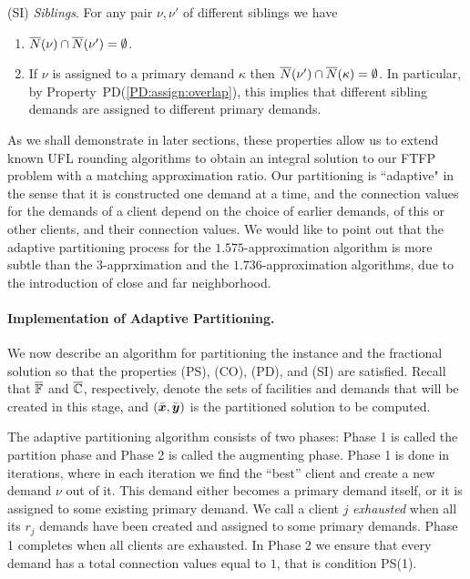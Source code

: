 \documentclass[11pt]{article}
\begin{document}
\begin{description}
\begin{enumerate}
\begin{enumerate}
			\end{enumerate}

	\end{enumerate}
	
\item{(SI)} \emph{Siblings}. For any pair $\nu,\nu'$ of different siblings we have
  \begin{enumerate}

	\item \label{SI:siblings disjoint}
		  ${\overline{N}}(\nu)\cap {\overline{N}}(\nu') = \emptyset$.
		
	\item \label{SI:primary disjoint} If $\nu$ is assigned to a primary demand $\kappa$ then
 		${\overline{N}}(\nu')\cap {\overline{N}}(\kappa) = \emptyset$. In particular, by Property~PD(\ref{PD:assign:overlap}),
		this implies that different sibling demands are assigned to different primary demands.

	\end{enumerate}
	
\end{description}

As we shall demonstrate in later sections, these properties allow us
to extend known UFL rounding algorithms to obtain an integral solution
to our FTFP problem with a matching approximation ratio. Our
partitioning is ``adaptive" in the sense that it is constructed one
demand at a time, and the connection values for the demands of a
client depend on the choice of earlier demands, of this or other
clients, and their connection values. We would like to point out that
the adaptive partitioning process for the $1.575$-approximation
algorithm is more subtle than the $3$-apprximation and the
$1.736$-approximation algorithms, due to the introduction of close and
far neighborhood.


\paragraph{Implementation of Adaptive Partitioning.}
We now describe an algorithm for partitioning the instance
and the fractional solution so that the properties (PS),
(CO), (PD), and (SI) are satisfied.  Recall that
$\overline{\mathbb{F}}$ and $\overline{\mathbb{C}}$, respectively, denote the
sets of facilities and demands that will be created in this
stage, and $(\bar{\boldsymbol{x}},\bar{\boldsymbol{y}})$ is the partitioned solution
to be computed. 

The adaptive partitioning algorithm consists of two phases:
Phase 1 is called the partition phase and Phase 2 is called
the augmenting phase. Phase 1 is done in iterations, where
in each iteration we find the ``best'' client and create a
new demand $\nu$ out of it. This demand either becomes a
primary demand itself, or it is assigned to some existing
primary demand. We call a client $j$ \emph{exhausted} when
all its $r_j$ demands have been created and assigned to some
primary demands. Phase 1 completes when all clients are
exhausted. In Phase 2 we ensure that every demand has a
total connection values equal to $1$, that is condition
PS(1).
\end{document}
